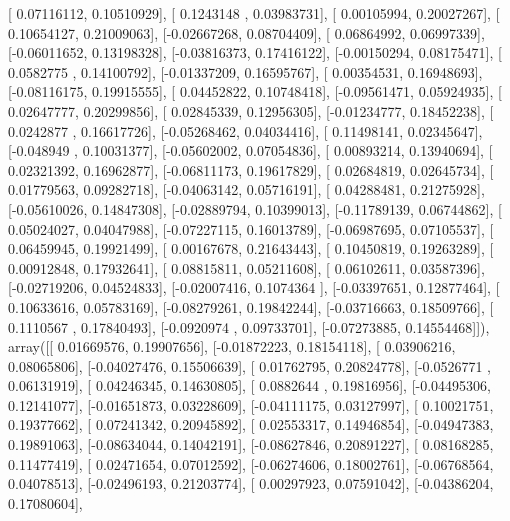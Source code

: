\documentclass{article}
\begin{document}
       [ 0.07116112,  0.10510929],
       [ 0.1243148 ,  0.03983731],
       [ 0.00105994,  0.20027267],
       [ 0.10654127,  0.21009063],
       [-0.02667268,  0.08704409],
       [ 0.06864992,  0.06997339],
       [-0.06011652,  0.13198328],
       [-0.03816373,  0.17416122],
       [-0.00150294,  0.08175471],
       [ 0.0582775 ,  0.14100792],
       [-0.01337209,  0.16595767],
       [ 0.00354531,  0.16948693],
       [-0.08116175,  0.19915555],
       [ 0.04452822,  0.10748418],
       [-0.09561471,  0.05924935],
       [ 0.02647777,  0.20299856],
       [ 0.02845339,  0.12956305],
       [-0.01234777,  0.18452238],
       [ 0.0242877 ,  0.16617726],
       [-0.05268462,  0.04034416],
       [ 0.11498141,  0.02345647],
       [-0.048949  ,  0.10031377],
       [-0.05602002,  0.07054836],
       [ 0.00893214,  0.13940694],
       [ 0.02321392,  0.16962877],
       [-0.06811173,  0.19617829],
       [ 0.02684819,  0.02645734],
       [ 0.01779563,  0.09282718],
       [-0.04063142,  0.05716191],
       [ 0.04288481,  0.21275928],
       [-0.05610026,  0.14847308],
       [-0.02889794,  0.10399013],
       [-0.11789139,  0.06744862],
       [ 0.05024027,  0.04047988],
       [-0.07227115,  0.16013789],
       [-0.06987695,  0.07105537],
       [ 0.06459945,  0.19921499],
       [ 0.00167678,  0.21643443],
       [ 0.10450819,  0.19263289],
       [ 0.00912848,  0.17932641],
       [ 0.08815811,  0.05211608],
       [ 0.06102611,  0.03587396],
       [-0.02719206,  0.04524833],
       [-0.02007416,  0.1074364 ],
       [-0.03397651,  0.12877464],
       [ 0.10633616,  0.05783169],
       [-0.08279261,  0.19842244],
       [-0.03716663,  0.18509766],
       [ 0.1110567 ,  0.17840493],
       [-0.0920974 ,  0.09733701],
       [-0.07273885,  0.14554468]]), array([[ 0.01669576,  0.19907656],
       [-0.01872223,  0.18154118],
       [ 0.03906216,  0.08065806],
       [-0.04027476,  0.15506639],
       [ 0.01762795,  0.20824778],
       [-0.0526771 ,  0.06131919],
       [ 0.04246345,  0.14630805],
       [ 0.0882644 ,  0.19816956],
       [-0.04495306,  0.12141077],
       [-0.01651873,  0.03228609],
       [-0.04111175,  0.03127997],
       [ 0.10021751,  0.19377662],
       [ 0.07241342,  0.20945892],
       [ 0.02553317,  0.14946854],
       [-0.04947383,  0.19891063],
       [-0.08634044,  0.14042191],
       [-0.08627846,  0.20891227],
       [ 0.08168285,  0.11477419],
       [ 0.02471654,  0.07012592],
       [-0.06274606,  0.18002761],
       [-0.06768564,  0.04078513],
       [-0.02496193,  0.21203774],
       [ 0.00297923,  0.07591042],
       [-0.04386204,  0.17080604],
\end{document}
